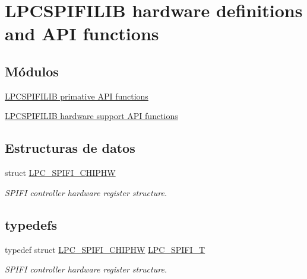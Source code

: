 \hypertarget{group___l_p_c_s_p_i_f_i_l_i_b___h_w___a_p_i}{}\section{L\+P\+C\+S\+P\+I\+F\+I\+L\+IB hardware definitions and A\+PI functions}
\label{group___l_p_c_s_p_i_f_i_l_i_b___h_w___a_p_i}
\subsection*{Módulos}
\begin{DoxyCompactItemize}
\item 
\hyperlink{group___l_p_c_s_p_i_f_i_l_i_b___h_w___p_r_i_m}{L\+P\+C\+S\+P\+I\+F\+I\+L\+I\+B primative A\+P\+I functions}
\item 
\hyperlink{group___l_p_c_s_p_i_f_i_l_i_b___h_w___l2}{L\+P\+C\+S\+P\+I\+F\+I\+L\+I\+B hardware support A\+P\+I functions}
\end{DoxyCompactItemize}
\subsection*{Estructuras de datos}
\begin{DoxyCompactItemize}
\item 
struct \hyperlink{struct_l_p_c___s_p_i_f_i___c_h_i_p_h_w}{L\+P\+C\+\_\+\+S\+P\+I\+F\+I\+\_\+\+C\+H\+I\+P\+HW}
\begin{DoxyCompactList}\small\item\em S\+P\+I\+FI controller hardware register structure. \end{DoxyCompactList}\end{DoxyCompactItemize}
\subsection*{\textquotesingle{}typedefs\textquotesingle{}}
\begin{DoxyCompactItemize}
\item 
typedef struct \hyperlink{struct_l_p_c___s_p_i_f_i___c_h_i_p_h_w}{L\+P\+C\+\_\+\+S\+P\+I\+F\+I\+\_\+\+C\+H\+I\+P\+HW} \hyperlink{group___l_p_c_s_p_i_f_i_l_i_b___h_w___a_p_i_ga69ca4e6bace5ac7e7a2ae3cdc0d569b3}{L\+P\+C\+\_\+\+S\+P\+I\+F\+I\+\_\+T}
\begin{DoxyCompactList}\small\item\em S\+P\+I\+FI controller hardware register structure. \end{DoxyCompactList}\end{DoxyCompactItemize}


